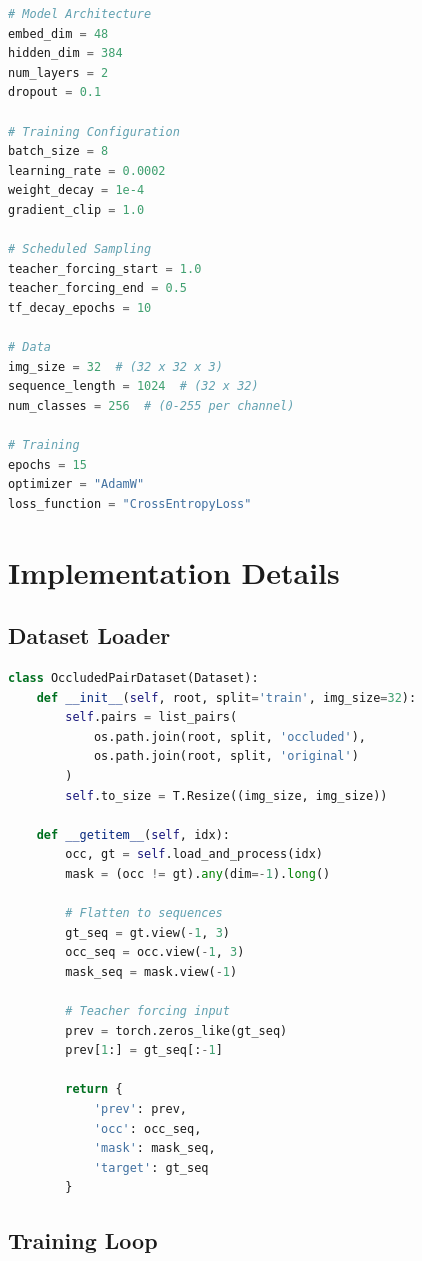 \documentclass[12pt,a4paper]{article}
\begin{document}
\begin{lstlisting}[language=Python, caption=Complete Hyperparameter Configuration]
# Model Architecture
embed_dim = 48
hidden_dim = 384
num_layers = 2
dropout = 0.1

# Training Configuration
batch_size = 8
learning_rate = 0.0002
weight_decay = 1e-4
gradient_clip = 1.0

# Scheduled Sampling
teacher_forcing_start = 1.0
teacher_forcing_end = 0.5
tf_decay_epochs = 10

# Data
img_size = 32  # (32 x 32 x 3)
sequence_length = 1024  # (32 x 32)
num_classes = 256  # (0-255 per channel)

# Training
epochs = 15
optimizer = "AdamW"
loss_function = "CrossEntropyLoss"
\end{lstlisting}

\section{Implementation Details}

\subsection{Dataset Loader}

\begin{lstlisting}[language=Python, caption=Dataset Implementation]
class OccludedPairDataset(Dataset):
    def __init__(self, root, split='train', img_size=32):
        self.pairs = list_pairs(
            os.path.join(root, split, 'occluded'),
            os.path.join(root, split, 'original')
        )
        self.to_size = T.Resize((img_size, img_size))
        
    def __getitem__(self, idx):
        occ, gt = self.load_and_process(idx)
        mask = (occ != gt).any(dim=-1).long()
        
        # Flatten to sequences
        gt_seq = gt.view(-1, 3)
        occ_seq = occ.view(-1, 3)
        mask_seq = mask.view(-1)
        
        # Teacher forcing input
        prev = torch.zeros_like(gt_seq)
        prev[1:] = gt_seq[:-1]
        
        return {
            'prev': prev,
            'occ': occ_seq,
            'mask': mask_seq,
            'target': gt_seq
        }
\end{lstlisting}

\subsection{Training Loop}
\end{document}
